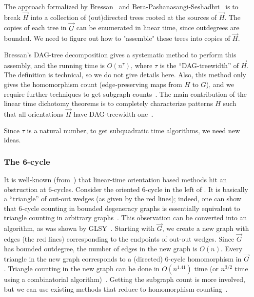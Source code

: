 \documentclass[a4paper,UKenglish,cleveref, autoref, numberwithinsect, thm-restate]{lipics-v2021}
\begin{document}
	The approach formalized by Bressan~\cite{Br21} and Bera-Pashanasangi-Seshadhri~\cite{BePaSe20} is to break $\vec{H}$ into a collection of (out)directed trees rooted at the sources of $\vec{H}$. 
	The copies of each tree in $\vec{G}$ can be enumerated in linear time, since outdegrees
	are bounded. We need to figure out how to "assemble" these trees into copies of $\vec{H}$.
	
	Bressan's DAG-tree decomposition gives a systematic method to perform this assembly,
	and the running time is $O(n^\tau)$, where $\tau$ is the ``DAG-treewidth'' of $\vec{H}$.
	The definition is technical, so we do not give details here. 
	Also, this method only gives the homomorphism count (edge-preserving maps from $H$ to $G$), and we require further
	techniques to get subgraph counts~\cite{CuDeMa17}. 
	The main contribution of the linear time dichotomy theorems is to completely characterize patterns $H$ such that all orientations $\vec{H}$ have DAG-treewidth one~\cite{BePaSe21,BeGiLe+22}. 
	
	Since $\tau$ is a natural number, to get subquadratic time algorithms, we need new ideas.
	
	\subsubsection{The 6-cycle} It is well-known (from~\cite{AlYuZw97}) that linear-time orientation based methods hit an obstruction at $6$-cycles. 
    Consider the oriented $6$-cycle in the left of . It is basically a ``triangle'' of out-out wedges (as given by the red lines); indeed, one can show that $6$-cycle counting in bounded degeneracy graphs is essentially equivalent to triangle counting in arbitrary graphs~\cite{BePaSe20,BePaSe21,BeGiLe+22}.
    This observation can be converted into an algorithm, as was shown by GLSY~\cite{GiLeSh+23}. Starting with $\vec{G}$, we create a new graph with edges (the red lines) corresponding to the endpoints of out-out wedges. Since $\vec{G}$ has bounded outdegree, the number of edges in the new graph is $O(n)$. Every triangle in the new graph corresponds to a (directed) $6$-cycle homomorphism in $\vec{G}$.
	Triangle counting in the new graph can be done in $O(n^{1.41})$ time (or $n^{3/2}$ time using a combinatorial algorithm)~\cite{AlYuZw97}. 
    Getting the subgraph count is more involved, but we can use existing methods that reduce to homomorphism counting~\cite{CuDeMa17}.
	
\end{document}
